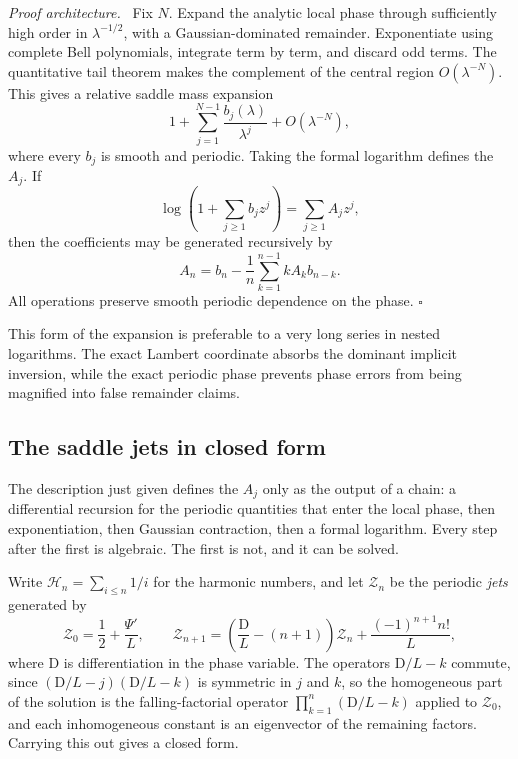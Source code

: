 \documentclass[11pt,oneside]{article}
\theoremstyle{definition}
\theoremstyle{remark}
\newenvironment{proofidea}{\par\smallskip\noindent\textit{Proof architecture.}\ }{\hfill$\square$\par\smallskip}
\begin{document}
\begin{proofidea}
Fix $N$.  Expand the analytic local phase through sufficiently high order in
$\lambda^{-1/2}$, with a Gaussian-dominated remainder.  Exponentiate using complete Bell
polynomials, integrate term by term, and discard odd terms.  The quantitative tail theorem
makes the complement of the central region $O(\lambda^{-N})$.  This gives a relative saddle
mass expansion
\begin{equation}
 1+\sum_{j=1}^{N-1}\frac{b_j(\lambda)}{\lambda^j}
 +O(\lambda^{-N}),                                        \label{eq:relative-mass-series}
\end{equation}
where every $b_j$ is smooth and periodic.  Taking the formal logarithm defines the $A_j$.
If
\begin{equation*}
 \log\left(1+\sum_{j\ge1}b_jz^j\right)=\sum_{j\ge1}A_jz^j,
\end{equation*}
then the coefficients may be generated recursively by
\begin{equation}
 A_n=b_n-\frac1n\sum_{k=1}^{n-1}kA_kb_{n-k}.               \label{eq:log-coefficient-recurrence}
\end{equation}
All operations preserve smooth periodic dependence on the phase.
\end{proofidea}

This form of the expansion is preferable to a very long series in nested logarithms.  The
exact Lambert coordinate absorbs the dominant implicit inversion, while the exact periodic
phase prevents phase errors from being magnified into false remainder claims.

\subsection{The saddle jets in closed form}
\label{subsec:as-jets}

The description just given defines the $A_j$ only as the output of a chain: a differential
recursion for the periodic quantities that enter the local phase, then exponentiation, then
Gaussian contraction, then a formal logarithm.  Every step after the first is algebraic.  The
first is not, and it can be solved.

Write $\mathcal H_n=\sum_{i\le n}1/i$ for the harmonic numbers, and let $\mathcal Z_{n}$ be the periodic
\emph{jets} generated by
\begin{equation}
 \mathcal Z_{0}=\frac12+\frac{\Psi'}{L},
 \qquad
 \mathcal Z_{n+1}=\left(\frac{\mathrm D}{L}-(n+1)\right)\mathcal Z_{n}+\frac{(-1)^{n+1}n!}{L},
                                                          \label{eq:as-jet-recursion}
\end{equation}
where $\mathrm D$ is differentiation in the phase variable.  The operators $\mathrm D/L-k$ commute, since
$(\mathrm D/L-j)(\mathrm D/L-k)$ is symmetric in $j$ and $k$, so the homogeneous part of the solution is the
falling-factorial operator $\prod_{k=1}^{n}(\mathrm D/L-k)$ applied to $\mathcal Z_{0}$, and each inhomogeneous
constant is an eigenvector of the remaining factors.  Carrying this out gives a closed form.
\end{document}
